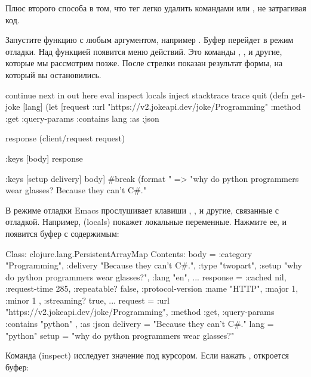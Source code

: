 Плюс второго способа в том, что тег легко удалить командами  или , не затрагивая код.

Запустите функцию с любым аргументом, например . Буфер перейдет в режим отладки. Над функцией появится меню действий. Это команды , ,  и другие, которые мы рассмотрим позже. После стрелки \code{=>} показан результат формы, на который вы остановились.

\begin{english}
  \begin{text}
continue next in out here eval inspect locals inject stacktrace trace quit
(defn get-joke [lang]
  (let [request
        {:url "https://v2.jokeapi.dev/joke/Programming"
         :method :get
         :query-params {:contains lang}
         :as :json}

        response
        (client/request request)

        {:keys [body]}
        response

        {:keys [setup delivery]}
        body]
    #break
    (format "%
 => "why do python programmers wear glasses? Because they can't C#."
  \end{text}
\end{english}

В режиме отладки Emacs прослушивает клавиши , ,  и другие, связанные с отладкой. Например,  (locals) покажет локальные переменные. Нажмите ее, и появится буфер с содержимым:

\begin{english}
  \begin{text}
Class: clojure.lang.PersistentArrayMap
Contents:
  body = { :category "Programming", :delivery "Because they can't C#.", :type "twopart", :setup "why do python programmers wear glasses?", :lang "en", ... }
  response = { :cached nil, :request-time 285, :repeatable? false, :protocol-version { :name "HTTP", :major 1, :minor 1 }, :streaming? true, ... }
  request = { :url "https://v2.jokeapi.dev/joke/Programming", :method :get, :query-params { :contains "python" }, :as :json }
  delivery = "Because they can't C#."
  lang = "python"
  setup = "why do python programmers wear glasses?"
  \end{text}
\end{english}

Команда  (inspect) исследует значение под курсором. Если нажать , откроется буфер:

